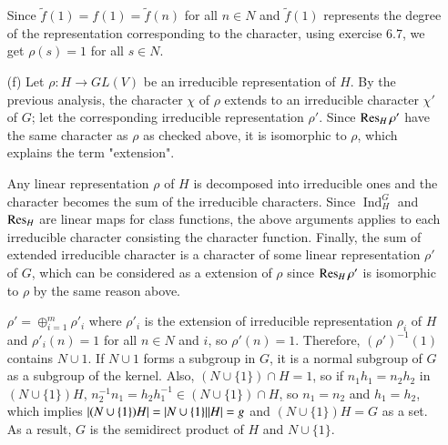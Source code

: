 \documentclass[a4paper, 12pt]{article}
\theoremstyle{Mydefinition}
\theoremstyle{Mytheorem}
\DeclareMathOperator{\Ind}{Ind}
\begin{document}
\begin{enumerate}
    Since $\tilde{f}(1) = f(1) = \tilde{f}(n)$ for all $n\in N$ and $\tilde{f}(1)$ represents the degree of the representation corresponding to the character, using exercise 6.7, we get $\rho(s) = 1$ for all $s\in N$.
    
    \item[(f)] Let $\rho:H\rightarrow GL(V)$ be an irreducible representation of $H$. By the previous analysis, the character $\chi$ of $\rho$ extends to an irreducible character $\chi'$ of $G$; let the corresponding irreducible representation $\rho'$. Since $\Res_H \rho'$ have the same character as $\rho$ as checked above, it is isomorphic to $\rho$, which explains the term "extension".
    
    Any linear representation $\rho$ of $H$ is decomposed into irreducible ones and the character becomes the sum of the irreducible characters. Since $\Ind_H^G$ and $\Res_H$ are linear maps for class functions, the above arguments applies to each irreducible character consisting the character function. Finally, the sum of extended irreducible character is a character of some linear representation $\rho'$ of $G$, which can be considered as a extension of $\rho$ since $\Res_H \rho'$ is isomorphic to  $\rho$ by the same reason above.
    
    $\rho' = \oplus_{i=1}^m \rho'_i$ where $\rho'_i$ is the extension of irreducible representation $\rho_i$ of $H$ and $\rho'_i(n) = 1$ for all $n\in N$ and $i$, so $\rho'(n) = 1$. Therefore, $(\rho')^{-1}(1)$ contains $N\cup {1}$. If $N\cup {1}$ forms a subgroup in $G$, it is a normal subgroup of $G$ as a subgroup of the kernel. Also, $(N\cup \{1\})\cap H = 1$, so if $n_1h_1 = n_2h_2$ in $(N\cup \{1\})H$, $n_2^{-1}n_1 = h_2h_1^{-1}\in (N\cup \{1\})\cap H$, so $n_1=n_2$ and $h_1=h_2$, which implies $\abs{(N\cup \{1\})H} = \abs{N\cup \{1\}}\abs{H} = g$ and $(N\cup \{1\})H = G$ as a set. As a result, $G$ is the semidirect product of $H$ and $N\cup \{1\}$.
    

\end{enumerate}
\end{document}
